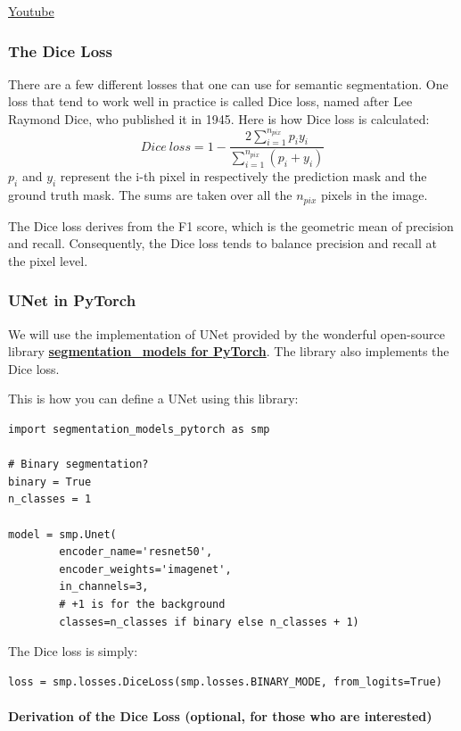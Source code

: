 \href{https://www.youtube.com/watch?v=ZCBJvfm6p8U&ab_channel=Udacity}{Youtube}

\subsubsection{The Dice Loss}

There are a few different losses that one can use for semantic segmentation. One loss that tend to work well in practice is called Dice loss, named after Lee Raymond Dice, who published it in 1945. Here is how Dice loss is calculated: \[Dice\ loss = 1 - \frac{2 \sum_{i=1}^{n_{pix}} p_i y_i}{\sum_{i=1}^{n_{pix}} (p_i + y_i)}\]
\(p_i\) and \(y_i\) represent the i-th pixel in respectively the prediction mask and the ground truth mask. The sums are taken over all the \(n_{pix}\) pixels in the image. \newline

The Dice loss derives from the F1 score, which is the geometric mean of precision and recall. Consequently, the Dice loss tends to balance precision and recall at the pixel level.

\subsubsection{UNet in PyTorch}

We will use the implementation of UNet provided by the wonderful open-source library \href{https://github.com/chsasank/segmentation_models.pytorch}{\textbf{segmentation\_models for PyTorch}}. The library also implements the Dice loss. \newline

This is how you can define a UNet using this library:
\begin{lstlisting}
import segmentation_models_pytorch as smp

# Binary segmentation?
binary = True
n_classes = 1

model = smp.Unet(
        encoder_name='resnet50',
        encoder_weights='imagenet',
        in_channels=3,
        # +1 is for the background
        classes=n_classes if binary else n_classes + 1)
\end{lstlisting}

The Dice loss is simply:
\begin{lstlisting}
loss = smp.losses.DiceLoss(smp.losses.BINARY_MODE, from_logits=True)
\end{lstlisting}
\paragraph{Derivation of the Dice Loss (optional, for those who are interested)}

